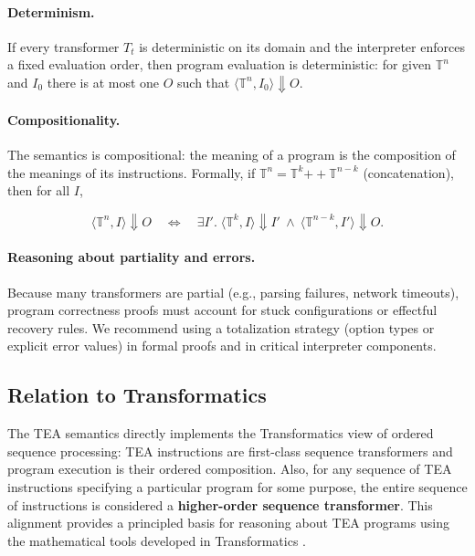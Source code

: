 \documentclass[sigplan,screen]{acmart}
\begin{document}
\paragraph{Determinism.} If every transformer \(T_{t}\) is deterministic on its domain and the interpreter enforces a fixed evaluation order, then program evaluation is deterministic: for given \(\mathbb{T}^n\) and \(I_0\) there is at most one \(O\) such that \(\langle \mathbb{T}^n, I_0\rangle \Downarrow O\).

\paragraph{Compositionality.} The semantics is compositional: the meaning of a program is the composition of the meanings of its instructions.  Formally, if \(\mathbb{T}^n = \mathbb{T}^k \mathbin{+\!\!+} \mathbb{T}^{n-k}\) (concatenation), then for all \(I\),


\[
\langle \mathbb{T}^n, I \rangle \Downarrow O \quad\Longleftrightarrow\quad
\exists I'.\; \langle \mathbb{T}^k, I \rangle \Downarrow I' \ \wedge\ \langle \mathbb{T}^{n-k}, I' \rangle \Downarrow O.
\]



\paragraph{Reasoning about partiality and errors.} Because many transformers are partial (e.g., parsing failures, network timeouts), program correctness proofs must account for stuck configurations or effectful recovery rules.  We recommend using a totalization strategy (option types or explicit error values) in formal proofs and in critical interpreter components.

\subsection{Relation to Transformatics}
The TEA semantics directly implements the Transformatics view of ordered sequence processing: TEA instructions are first-class sequence transformers and program execution is their ordered composition. Also, for any sequence of TEA instructions specifying a particular program for some purpose, the entire sequence of instructions is considered a \textbf{higher-order sequence transformer}.  This alignment provides a principled basis for reasoning about TEA programs using the mathematical tools developed in Transformatics \cite{Lutalo2025_transformatics_thesis}.
\end{document}
